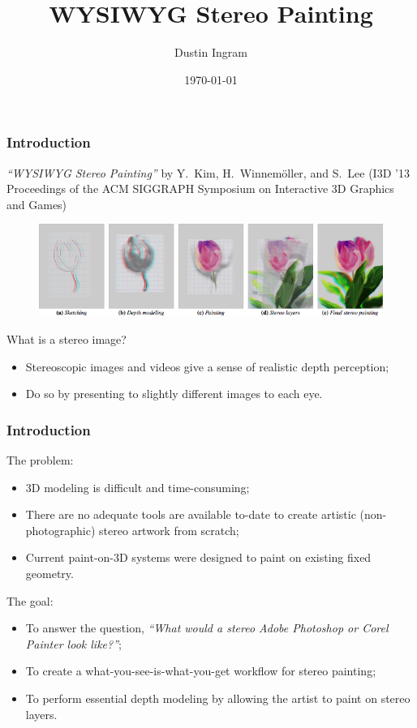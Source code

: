 \documentclass{beamer}
\title{WYSIWYG Stereo Painting}
\author{Dustin Ingram}
\institute{Interactive Computer Graphics, Spring 12-13\\ Drexel University
Department of Computer Science}
\date{\today}
\begin{document}
\maketitle

\begin{frame}
    \frametitle{Introduction}
    \emph{``WYSIWYG Stereo Painting''} by Y.~Kim, H.~Winnem\"{o}ller, and S.~Lee
    (I3D '13 Proceedings of the ACM SIGGRAPH Symposium on Interactive 3D
    Graphics and Games)
    \begin{figure}
        \centering
        \includegraphics[width=0.8\paperwidth]{f1.png}
    \end{figure}

    What is a stereo image?
    \begin{itemize}
        \item Stereoscopic images and videos give a sense of realistic depth
        perception;
        \item Do so by presenting to slightly different images to each eye.
    \end{itemize}
\end{frame}

\begin{frame}
    \frametitle{Introduction}
    The problem:
    \begin{itemize}
        \item 3D modeling is difficult and time-consuming;
        \item There are no adequate tools are available to-date to create
        artistic (non-photographic) stereo artwork from scratch;
        \item Current paint-on-3D systems were designed to paint on existing
        fixed geometry.
    \end{itemize}
    The goal:
    \begin{itemize}
        \item To answer the question, \emph{``What would a stereo Adobe
        Photoshop or Corel Painter look like?''};
        \item To create a what-you-see-is-what-you-get workflow for stereo
        painting;
        \item To perform essential depth modeling by allowing the artist to
        paint on stereo layers.
    \end{itemize}
\end{frame}
\end{document}

